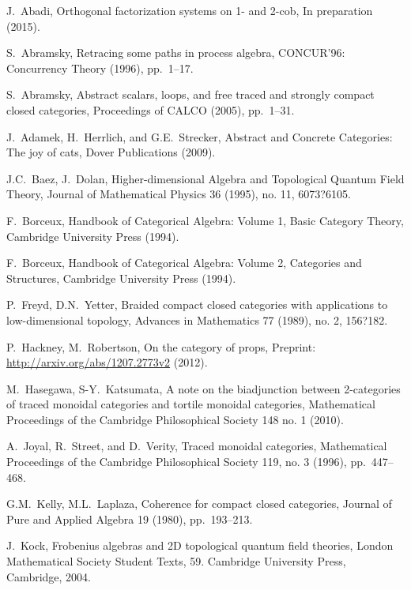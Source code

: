 \documentclass[11pt,oneside,article]{memoir}
\begin{document}
\begin{thebibliography}{XXX}

 J.~Abadi, Orthogonal factorization systems on 1- and 2-cob, In preparation (2015).

 S.~Abramsky, Retracing some paths in process algebra, CONCUR'96: Concurrency Theory (1996), pp.~1--17.

 S.~Abramsky, Abstract scalars, loops, and free traced and strongly compact closed categories, Proceedings of CALCO (2005), pp.~1--31.

 J.~Adamek, H.~Herrlich, and G.E.~Strecker, Abstract and Concrete Categories: The joy of cats, Dover Publications (2009).
 
 J.C.~Baez, J.~Dolan, Higher-dimensional Algebra and Topological Quantum Field Theory, Journal of Mathematical Physics 36 (1995), no. 11, 6073?6105.
 
F.~Borceux, Handbook of Categorical Algebra: Volume 1, Basic Category Theory, Cambridge University Press (1994).

 F.~Borceux, Handbook of Categorical Algebra: Volume 2, Categories and Structures, Cambridge University Press (1994).
 
 P.~Freyd, D.N.~Yetter, Braided compact closed categories with applications to low-dimensional topology,
Advances in Mathematics 77 (1989), no. 2, 156?182. 

 P.~Hackney, M.~Robertson, On the category of props, Preprint: \url{http://arxiv.org/abs/1207.2773v2} (2012).
 
M.~Hasegawa, S-Y.~Katsumata, A note on the biadjunction between 2-categories of traced monoidal categories and tortile monoidal categories, Mathematical Proceedings of the Cambridge Philosophical Society 148 no. 1 (2010).

 A.~Joyal, R.~Street, and D.~Verity, Traced monoidal categories, Mathematical Proceedings of the Cambridge Philosophical Society 119, no. 3 (1996), pp.~447--468.
 
 G.M.~Kelly, M.L.~Laplaza, Coherence for compact closed categories, Journal of Pure and Applied Algebra 19 (1980), pp.~193--213.
 
 J.~Kock, Frobenius algebras and 2D topological quantum field theories, London Mathematical Society Student Texts, 59. Cambridge University Press, Cambridge, 2004. 


\end{thebibliography}
\end{document}
